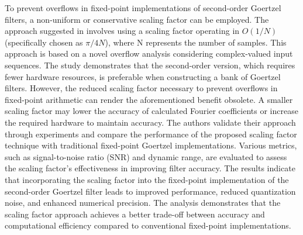 To prevent overflows in fixed-point implementations of second-order Goertzel filters, a non-uniform or conservative scaling factor can be employed. The approach suggested in \cite{6272009} involves using a scaling factor operating in $O(1/N)$ (specifically chosen as  \(\pi/4N\)), where N represents the number of samples. This approach is based on a novel overflow analysis considering complex-valued input sequences. The study demonstrates that the second-order version, which requires fewer hardware resources, is preferable when constructing a bank of Goertzel filters. However, the reduced scaling factor necessary to prevent overflows in fixed-point arithmetic can render the aforementioned benefit obsolete. A smaller scaling factor may lower the accuracy of calculated Fourier coefficients or increase the required hardware to maintain accuracy. The authors validate their approach through experiments and compare the performance of the proposed scaling factor technique with traditional fixed-point Goertzel implementations. Various metrics, such as signal-to-noise ratio (SNR) and dynamic range, are evaluated to assess the scaling factor's effectiveness in improving filter accuracy. The results indicate that incorporating the scaling factor into the fixed-point implementation of the second-order Goertzel filter leads to improved performance, reduced quantization noise, and enhanced numerical precision. The analysis demonstrates that the scaling factor approach achieves a better trade-off between accuracy and computational efficiency compared to conventional fixed-point implementations.